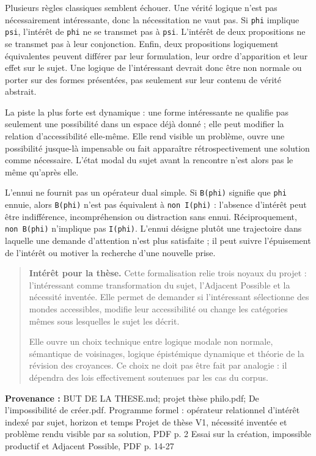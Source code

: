 \documentclass[10pt,a4paper]{article}
\begin{document}
Plusieurs règles classiques semblent échouer. Une vérité logique n'est pas nécessairement intéressante, donc la nécessitation ne vaut pas. Si \texttt{phi} implique \texttt{psi}, l'intérêt de \texttt{phi} ne se transmet pas à \texttt{psi}. L'intérêt de deux propositions ne se transmet pas à leur conjonction. Enfin, deux propositions logiquement équivalentes peuvent différer par leur formulation, leur ordre d'apparition et leur effet sur le sujet. Une logique de l'intéressant devrait donc être non normale ou porter sur des formes présentées, pas seulement sur leur contenu de vérité abstrait.

La piste la plus forte est dynamique : une forme intéressante ne qualifie pas seulement une possibilité dans un espace déjà donné ; elle peut modifier la relation d'accessibilité elle-même. Elle rend visible un problème, ouvre une possibilité jusque-là impensable ou fait apparaître rétrospectivement une solution comme nécessaire. L'état modal du sujet avant la rencontre n'est alors pas le même qu'après elle.

L'ennui ne fournit pas un opérateur dual simple. Si \texttt{B(phi)} signifie que \texttt{phi} ennuie, alors \texttt{B(phi)} n'est pas équivalent à \texttt{non I(phi)} : l'absence d'intérêt peut être indifférence, incompréhension ou distraction sans ennui. Réciproquement, \texttt{non B(phi)} n'implique pas \texttt{I(phi)}. L'ennui désigne plutôt une trajectoire dans laquelle une demande d'attention n'est plus satisfaite ; il peut suivre l'épuisement de l'intérêt ou motiver la recherche d'une nouvelle prise.

\begin{quote}
\textbf{Intérêt pour la thèse.} Cette formalisation relie trois noyaux du projet : l'intéressant comme transformation du sujet, l'Adjacent Possible et la nécessité inventée. Elle permet de demander si l'intéressant sélectionne des mondes accessibles, modifie leur accessibilité ou change les catégories mêmes sous lesquelles le sujet les décrit.

Elle ouvre un choix technique entre logique modale non normale, sémantique de voisinages, logique épistémique dynamique et théorie de la révision des croyances. Ce choix ne doit pas être fait par analogie : il dépendra des lois effectivement soutenues par les cas du corpus.
\end{quote}
{\footnotesize\color{metadata}\textbf{Provenance :} BUT DE LA THESE.md; projet thèse philo.pdf; De l'impossibilité de créer.pdf. Programme formel : opérateur relationnel d'intérêt indexé par sujet, horizon et temps Projet de thèse V1, nécessité inventée et problème rendu visible par sa solution, PDF p. 2 Essai sur la création, impossible productif et Adjacent Possible, PDF p. 14-27\par}
\end{document}
